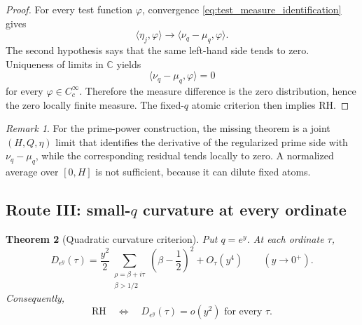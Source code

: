 \documentclass[11pt]{amsart}
\numberwithin{equation}{section}
\theoremstyle{plain}
\newtheorem{theorem}{Theorem}[section]
\theoremstyle{definition}
\theoremstyle{remark}
\newtheorem{remark}[theorem]{Remark}
\newcommand{\RH}{\mathrm{RH}}
\newcommand{\1}{\mathbf{1}}
\begin{document}
\begin{proof}
For every test function \(\varphi\), convergence
\eqref{eq:test_measure_identification} gives
\begin{equation}
\langle\eta_j,\varphi\rangle
\longrightarrow
\langle\nu_q-\mu_q,\varphi\rangle.
\label{eq:test_measure_limit_first}
\end{equation}
The second hypothesis says that the same left-hand side tends to zero.
Uniqueness of limits in \(\mathbb C\) yields
\begin{equation}
\langle\nu_q-\mu_q,\varphi\rangle=0
\label{eq:test_measure_limit_zero}
\end{equation}
for every \(\varphi\in C_c^\infty\).  Therefore the measure difference is
the zero distribution, hence the zero locally finite measure.  The
fixed-\(q\) atomic criterion then implies \(\RH\).
\end{proof}

\begin{remark}
\label{rem:route_distributional_missing}
For the prime-power construction, the missing theorem is a joint
\((H,Q,\eta)\) limit that identifies the derivative of the regularized
prime side with \(\nu_q-\mu_q\), while the corresponding residual tends
locally to zero.  A normalized average over \([0,H]\) is not sufficient,
because it can dilute fixed atoms.
\end{remark}

\subsection{Route III: small-\(q\) curvature at every ordinate}
\label{subsec:route_small_q}

\begin{theorem}[Quadratic curvature criterion]
\label{thm:small_q_curvature}
Put \(q=e^y\).  At each ordinate \(\tau\),
\begin{equation}
D_{e^y}(\tau)
=
\frac{y^2}{2}
\sum_{\substack{\rho=\beta+i\tau\\\beta>1/2}}
\left(\beta-\frac12\right)^2
+
O_\tau(y^4)
\qquad(y\to0^+).
\label{eq:small_q_curvature_expansion}
\end{equation}
Consequently,
\begin{equation}
\RH
\quad\Longleftrightarrow\quad
D_{e^y}(\tau)=o(y^2)
\text{ for every }\tau.
\label{eq:small_q_curvature_criterion}
\end{equation}
\end{theorem}
\end{document}
